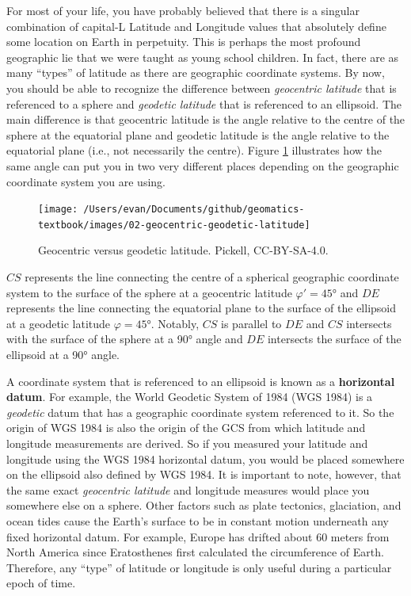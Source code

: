 \documentclass[
]{book}
\begin{document}
For most of your life, you have probably believed that there is a singular combination of capital-L Latitude and Longitude values that absolutely define some location on Earth in perpetuity. This is perhaps the most profound geographic lie that we were taught as young school children. In fact, there are as many ``types'' of latitude as there are geographic coordinate systems. By now, you should be able to recognize the difference between \emph{geocentric latitude} that is referenced to a sphere and \emph{geodetic latitude} that is referenced to an ellipsoid. The main difference is that geocentric latitude is the angle relative to the centre of the sphere at the equatorial plane and geodetic latitude is the angle relative to the equatorial plane (i.e., not necessarily the centre). Figure \ref{fig:2-geocentric-geodetic-latitude} illustrates how the same angle can put you in two very different places depending on the geographic coordinate system you are using.

\begin{figure}
\texttt{[image: /Users/evan/Documents/github/geomatics-textbook/images/02-geocentric-geodetic-latitude]} \caption{Geocentric versus geodetic latitude. Pickell, CC-BY-SA-4.0.}\label{fig:2-geocentric-geodetic-latitude}
\end{figure}

\(CS\) represents the line connecting the centre of a spherical geographic coordinate system to the surface of the sphere at a geocentric latitude \(φ′=45°\) and \(DE\) represents the line connecting the equatorial plane to the surface of the ellipsoid at a geodetic latitude \(φ=45°\). Notably, \(CS\) is parallel to \(DE\) and \(CS\) intersects with the surface of the sphere at a 90° angle and \(DE\) intersects the surface of the ellipsoid at a 90° angle.

A coordinate system that is referenced to an ellipsoid is known as a \textbf{horizontal datum}. For example, the World Geodetic System of 1984 (WGS 1984) is a \emph{geodetic} datum that has a geographic coordinate system referenced to it. So the origin of WGS 1984 is also the origin of the GCS from which latitude and longitude measurements are derived. So if you measured your latitude and longitude using the WGS 1984 horizontal datum, you would be placed somewhere on the ellipsoid also defined by WGS 1984. It is important to note, however, that the same exact \emph{geocentric latitude} and longitude measures would place you somewhere else on a sphere. Other factors such as plate tectonics, glaciation, and ocean tides cause the Earth's surface to be in constant motion underneath any fixed horizontal datum. For example, Europe has drifted about 60 meters from North America since Eratosthenes first calculated the circumference of Earth. Therefore, any ``type'' of latitude or longitude is only useful during a particular epoch of time.
\end{document}
